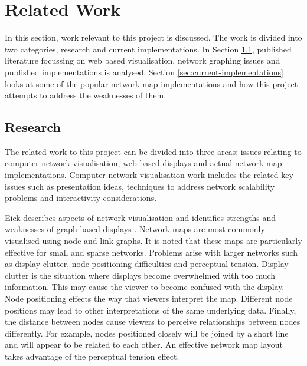 \documentclass[11pt, a4paper]{article}
\begin{document}
\newpage

\section{Related Work}
\label{sec:related-work}

In this section, work relevant to this project is discussed. The work is divided
into two categories, research and current implementations. In Section
\ref{sec:research}, published literature focussing on web based visualisation,
network graphing issues and published implementations is analysed. Section
\ref{sec:current-implementations} looks at some of the popular network map
implementations and how this project attempts to address the weaknesses of them.

\subsection{Research}
\label{sec:research}

The related work to this project can be divided into three areas: issues
relating to computer network visualisation, web based displays and actual
network map implementations. Computer network visualisation work includes the
related key issues such as presentation ideas, techniques to address network
scalability problems and interactivity considerations.

Eick describes aspects of network visualisation and identifies strengths and
weaknesses of graph based displays \cite{Eick_1996}. Network maps are most
commonly visualised using node and link graphs. It is noted that these maps are
particularly effective for small and sparse networks. Problems arise with larger
networks such as display clutter, node positioning difficulties and perceptual
tension. Display clutter is the situation where displays become overwhelmed with
too much information. This may cause the viewer to become confused with the
display. Node positioning effects the way that viewers interpret the map.
Different node positions may lead to other interpretations of the same
underlying data. Finally, the distance between nodes cause viewers to perceive
relationships between nodes differently. For example, nodes positioned closely
will be joined by a short line and will appear to be related to each other. An
effective network map layout takes advantage of the perceptual tension effect.
\end{document}
